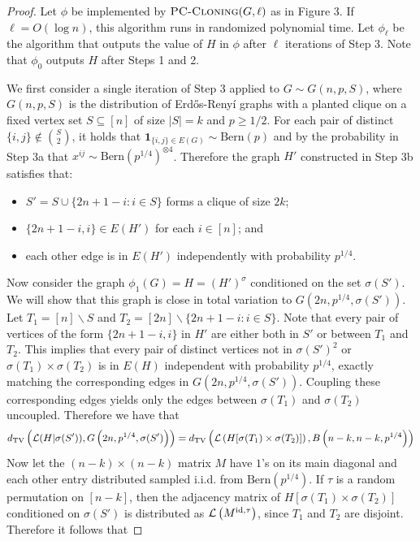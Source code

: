 \documentclass[11pt]{article}
\begin{document}
\begin{proof}
Let $\phi$ be implemented by $\textsc{PC-Cloning}(G, \ell)$ as in Figure 3. If $\ell = O(\log n)$, this algorithm runs in randomized polynomial time. Let $\phi_\ell$ be the algorithm that outputs the value of $H$ in $\phi$ after $\ell$ iterations of Step 3. Note that $\phi_0$ outputs $H$ after Steps 1 and 2.

We first consider a single iteration of Step 3 applied to $G \sim G(n, p, S)$, where $G(n, p, S)$ is the distribution of Erd\H{o}s-Reny\'{i} graphs with a planted clique on a fixed vertex set $S \subseteq [n]$ of size $|S| = k$ and $p \ge 1/2$. For each pair of distinct $\{i, j\} \not \in \binom{S}{2}$, it holds that $\mathbf{1}_{\{i, j\} \in E(G)} \sim \text{Bern}(p)$ and by the probability in Step 3a that $x^{ij} \sim \text{Bern}(p^{1/4})^{\otimes 4}$. Therefore the graph $H'$ constructed in Step 3b satisfies that:
\begin{itemize}
\item $S' = S \cup \{ 2n + 1 - i : i \in S\}$ forms a clique of size $2k$;
\item $\{2n + 1 - i, i\} \in E(H')$ for each $i \in [n]$; and
\item each other edge is in $E(H')$ independently with probability $p^{1/4}$.
\end{itemize}
Now consider the graph $\phi_1(G) = H = (H')^\sigma$ conditioned on the set $\sigma(S')$. We will show that this graph is close in total variation to $G(2n, p^{1/4}, \sigma(S'))$. Let $T_1 = [n] \backslash S$ and $T_2 = [2n]\backslash \{ 2n + 1 - i : i \in S\}$. Note that every pair of vertices of the form $\{2n + 1 - i, i\}$ in $H'$ are either both in $S'$ or between $T_1$ and $T_2$. This implies that every pair of distinct vertices not in $\sigma(S')^2$ or $\sigma(T_1) \times \sigma(T_2)$ is in $E(H)$ independent with probability $p^{1/4}$, exactly matching the corresponding edges in $G(2n, p^{1/4}, \sigma(S'))$. Coupling these corresponding edges yields only the edges between $\sigma(T_1)$ and $\sigma(T_2)$ uncoupled. Therefore we have that
$$d_{\text{TV}}\left( \mathcal{L}(H | \sigma(S')), G\left(2n, p^{1/4}, \sigma(S')\right) \right) = d_{\text{TV}}\left( \mathcal{L}\left(H[\sigma(T_1) \times \sigma(T_2)]\right), B\left(n - k, n - k, p^{1/4}\right) \right)$$
Now let the $(n - k) \times (n - k)$ matrix $M$ have $1$'s on its main diagonal and each other entry distributed sampled i.i.d. from $\text{Bern}(p^{1/4})$. If $\tau$ is a random permutation on $[n-k]$, then the adjacency matrix of $H[\sigma(T_1) \times \sigma(T_2)]$ conditioned on $\sigma(S')$ is distributed as $\mathcal{L}\left( M^{\text{id}, \tau} \right)$, since $T_1$ and $T_2$ are disjoint. Therefore it follows that

\end{proof}
\end{document}
